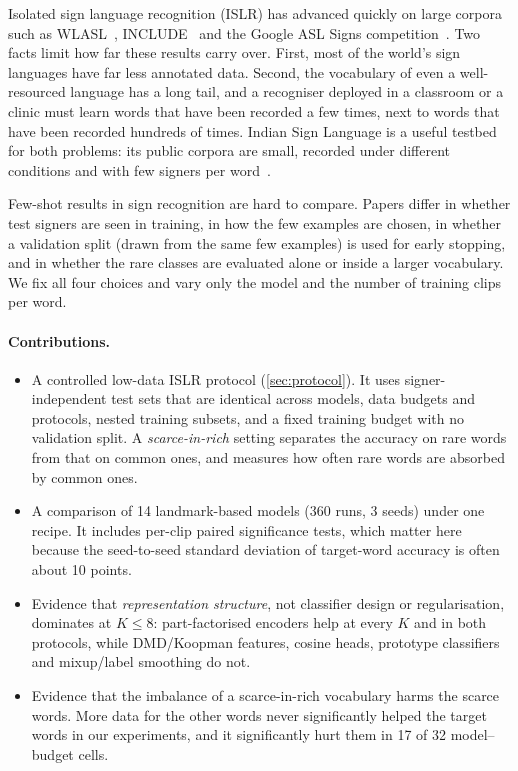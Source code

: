 \documentclass[11pt]{article}
\begin{document}
Isolated sign language recognition (ISLR) has advanced quickly on large corpora such as
WLASL~\citep{li2020wlasl}, INCLUDE~\citep{sridhar2020include} and the Google ASL Signs
competition~\citep{kaggle2023aslsigns}. Two facts limit how far these results carry over.
First, most of the world's sign languages have far less annotated data. Second, the
vocabulary of even a well-resourced language has a long tail, and a recogniser deployed in a
classroom or a clinic must learn words that have been recorded a few times, next to words
that have been recorded hundreds of times. Indian Sign Language is a useful testbed for both
problems: its public corpora are small, recorded under different conditions and with few
signers per word~\citep{sridhar2020include,joshi2022cislr,patra2024hwgat}.

Few-shot results in sign recognition are hard to compare. Papers differ in whether test
signers are seen in training, in how the few examples are chosen, in whether a validation
split (drawn from the same few examples) is used for early stopping, and in whether the rare
classes are evaluated alone or inside a larger vocabulary. We fix all four choices and vary
only the model and the number of training clips per word.

\paragraph{Contributions.}
\begin{itemize}
  \item A controlled low-data ISLR protocol (\cref{sec:protocol}). It uses signer-independent
  test sets that are identical across models, data budgets and protocols, nested training
  subsets, and a fixed training budget with no validation split. A \emph{scarce-in-rich}
  setting separates the accuracy on rare words from that on common ones, and measures how
  often rare words are absorbed by common ones.
  \item A comparison of 14 landmark-based models (360 runs, 3 seeds) under one recipe. It
  includes per-clip paired significance tests, which matter here because the seed-to-seed
  standard deviation of target-word accuracy is often about 10 points.
  \item Evidence that \emph{representation structure}, not classifier design or
  regularisation, dominates at $K\le 8$: part-factorised encoders help at every $K$ and in
  both protocols, while DMD/Koopman features, cosine heads, prototype classifiers and
  mixup/label smoothing do not.
  \item Evidence that the imbalance of a scarce-in-rich vocabulary harms the scarce words.
  More data for the other words never significantly helped the target words in our
  experiments, and it significantly hurt them in 17 of 32 model--budget cells.
\end{itemize}
\end{document}
